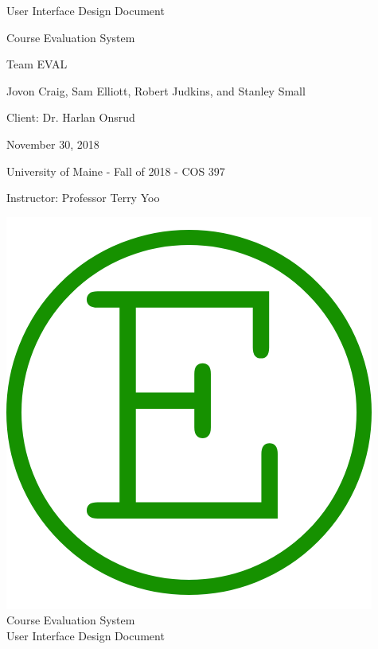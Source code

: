\documentclass{article}
\begin{document}
\begin{titlepage}


\centering
\vspace*{2cm}
{\Huge User Interface Design Document\par}
\vspace{.25cm}
{\LARGE Course Evaluation System\par}
\vspace{1cm}
{\Large Team EVAL\par}
\vspace{.2cm}
{\Large Jovon Craig, Sam Elliott, Robert Judkins, and Stanley Small\par}
\vspace{1cm}
{\Large Client: Dr. Harlan Onsrud\par}
\vspace{1cm}
{\Large November 30, 2018\par}
\vspace{11cm}

University of Maine - Fall of 2018 - COS 397

Instructor: Professor Terry Yoo

\end{titlepage}

\newpage

\begin{center}
{\includegraphics[scale=.2]{images/team_logo.png}} \\ 	\bigskip
{\LARGE Course Evaluation System } \\ \medskip
{\large User Interface Design Document } \\ \medskip
\end{center}
\end{document}
